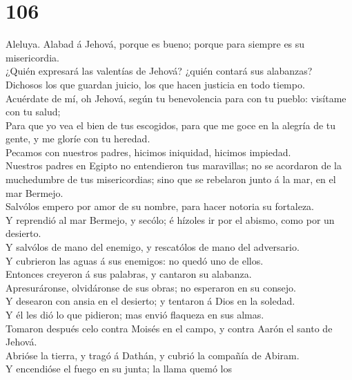 \hypertarget{section-105}{%
\section{106}\label{section-105}}

 Aleluya. Alabad á Jehová, porque es bueno; porque para
siempre es su misericordia.\\
 ¿Quién expresará las valentías de Jehová? ¿quién contará
sus alabanzas?\\
 Dichosos los que guardan juicio, los que hacen justicia en
todo tiempo.\\
 Acuérdate de mí, oh Jehová, según tu benevolencia para con
tu pueblo: visítame con tu salud;\\
 Para que yo vea el bien de tus escogidos, para que me goce
en la alegría de tu gente, y me gloríe con tu heredad.\\
 Pecamos con nuestros padres, hicimos iniquidad, hicimos
impiedad.\\
 Nuestros padres en Egipto no entendieron tus maravillas; no
se acordaron de la muchedumbre de tus misericordias; sino que se
rebelaron junto á la mar, en el mar Bermejo.\\
 Salvólos empero por amor de su nombre, para hacer notoria
su fortaleza.\\
 Y reprendió al mar Bermejo, y secólo; é hízoles ir por el
abismo, como por un desierto.\\
 Y salvólos de mano del enemigo, y rescatólos de mano del
adversario.\\
 Y cubrieron las aguas á sus enemigos: no quedó uno de
ellos.\\
 Entonces creyeron á sus palabras, y cantaron su
alabanza.\\
 Apresuráronse, olvidáronse de sus obras; no esperaron en
su consejo.\\
 Y desearon con ansia en el desierto; y tentaron á Dios en
la soledad.\\
 Y él les dió lo que pidieron; mas envió flaqueza en sus
almas.\\
 Tomaron después celo contra Moisés en el campo, y contra
Aarón el santo de Jehová.\\
 Abrióse la tierra, y tragó á Dathán, y cubrió la compañía
de Abiram.\\
 Y encendióse el fuego en su junta; la llama quemó los
